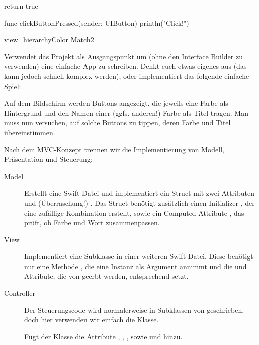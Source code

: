 \documentclass[parskip=half, final]{scrreprt}
\begin{document}
\begin{lecture}
\begin{enumerate}
\begin{swiftcode}
{    return true
}

func clickButtonPressed(sender: UIButton) {
    println("Click!")
}
\end{swiftcode}

\end{enumerate}

\begin{exc}

\begin{excitem}{view_hierarchy}{Color Match}{2}

Verwendet das  Projekt als Ausgangspunkt um (ohne den Interface Builder zu verwenden) eine einfache App zu schreiben. Denkt euch etwas eigenes aus (das kann jedoch schnell komplex werden), oder implementiert das folgende einfache Spiel:

Auf dem Bildschirm werden Buttons angezeigt, die jeweils eine Farbe als Hintergrund und den Namen einer (ggfs. anderen!) Farbe als Titel tragen. Man muss nun versuchen, auf solche Buttons zu tippen, deren Farbe und Titel übereinstimmen.

Nach dem MVC-Konzept trennen wir die Implementierung von Modell, Präsentation und Steuerung:

\begin{description}
	\item[Model] Erstellt eine Swift Datei  und implementiert ein Struct  mit zwei Attributen  und (Überraschung!) . Das Struct benötigt zusätzlich einen Initializer , der eine zufällige Kombination erstellt, sowie ein Computed Attribute , das prüft, ob Farbe und Wort zusammenpassen.
	\item[View] Implementiert eine Subklasse  in einer weiteren Swift Datei. Diese benötigt nur eine Methode , die eine Instanz  als Argument annimmt und die  und  Attribute, die von  geerbt werden, entsprechend setzt.
	\item[Controller] Der Steuerungscode wird normalerweise in Subklassen von  geschrieben, doch hier verwenden wir einfach die  Klasse.
	
	Fügt der  Klasse die Attribute , , , sowie  und  hinzu.
	

\end{description}
\end{excitem}
\end{exc}
\end{lecture}
\end{document}
